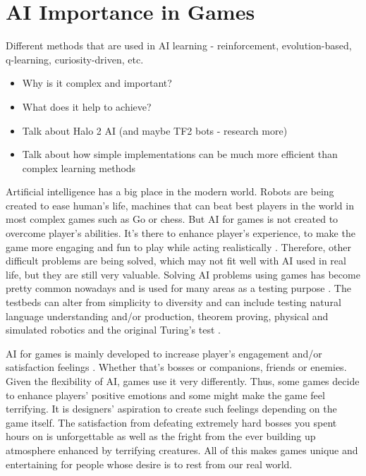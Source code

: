 \documentclass[journal]{IEEEtran}
\begin{document}
\section{AI Importance in Games}
Different methods that are used in AI learning - reinforcement, evolution-based, q-learning, curiosity-driven, etc. 
\begin{itemize}
	\item Why is it complex and important?
	\item What does it help to achieve? 
	\item Talk about Halo 2 AI (and maybe TF2 bots - research more)
	\item Talk about how simple implementations can be much more efficient than complex learning methods
\end{itemize}

Artificial intelligence has a big place in the modern world. Robots are being created to ease human's life, machines that can beat best players in the world in most complex games such as Go \cite{alphago} or chess. But AI for games is not created to overcome player's abilities. It's there to enhance player's experience, to make the game more engaging and fun to play \cite{aiinvideogames} while acting realistically \cite{chaslot2008monte}. Therefore, other difficult problems are being solved, which may not fit well with AI used in real life, but they are still very valuable. Solving AI problems using games has become pretty common nowadays and is used for many areas as a testing purpose \cite{schaul2011measuring}. The testbeds can alter from simplicity to diversity \cite{schaul2011measuring} and can include testing natural language understanding and/or production, theorem proving, physical and simulated robotics and the original Turing's test \cite{schaul2011measuring}.

AI for games is mainly developed to increase player's engagement and/or satisfaction feelings \cite{halo2}. Whether that's bosses or companions, friends or enemies. Given the flexibility of AI, games use it very differently. Thus, some games decide to enhance players' positive emotions and some might make the game feel terrifying. It is designers' aspiration to create such feelings depending on the game itself. The satisfaction from defeating extremely hard bosses you spent hours on is unforgettable as well as the fright from the ever building up atmosphere enhanced by terrifying creatures. All of this makes games unique and entertaining for people whose desire is to rest from our real world.
\end{document}
